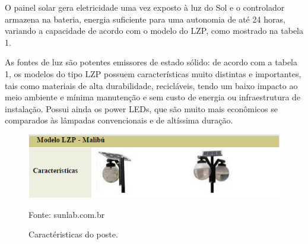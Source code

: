 \begin{itemize}
	O painel solar gera eletricidade uma vez exposto à luz do Sol e o controlador armazena na bateria, energia suficiente para uma autonomia de até 24 horas, variando a capacidade de acordo com o modelo do LZP, como mostrado na tabela 1.
	
	As fontes de luz são potentes emissores de estado sólido:  de acordo com a tabela 1, os modelos do tipo LZP possuem características muito distintas e importantes, tais como  materiais de alta durabilidade, recicláveis, tendo um baixo impacto ao meio ambiente e mínima manutenção e sem custo de energia ou infraestrutura de instalação.  	Possui ainda os power LEDs, que são muito mais econômicos se comparados às lâmpadas convencionais e de altíssima duração.
\end{itemize}

	\begin{figure}[H]
	 \centering
	\label{Caractéristicas do poste}
	 \includegraphics[keepaspectratio=true,scale=0.8]{postes/tabelaLZP.png}
	 \caption{Caractéristicas do poste.}
	 \small{Fonte: sunlab.com.br}
	\end{figure}


